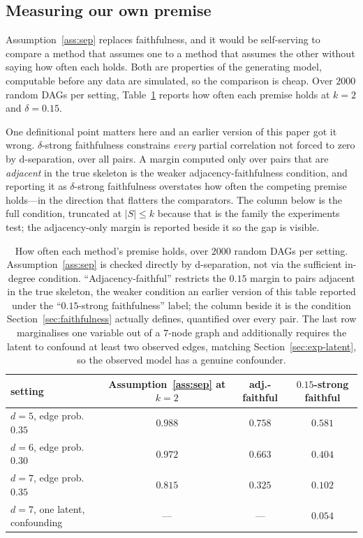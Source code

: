 \subsection{Measuring our own premise}\label{sec:exp-premise}

Assumption~\ref{ass:sep} replaces faithfulness, and it would be
self-serving to compare a method that assumes one to a method that assumes the
other without saying how often each holds. Both are properties of the
generating model, computable before any data are simulated, so the comparison
is cheap. Over $2000$ random DAGs per setting, Table~\ref{tab:premises} reports
how often each premise holds at $k = 2$ and $\delta = 0.15$.

One definitional point matters here and an earlier version of this paper got it
wrong. $\delta$-strong faithfulness constrains \emph{every} partial correlation
not forced to zero by d-separation, over all pairs. A margin computed only over
pairs that are \emph{adjacent} in the true skeleton is the weaker
adjacency-faithfulness condition, and reporting it as $\delta$-strong
faithfulness overstates how often the competing premise holds---in the
direction that flatters the comparators. The column below is the full
condition, truncated at $|S| \le k$ because that is the family the experiments
test; the adjacency-only margin is reported beside it so the gap is visible.

\begin{table}[t]
\centering
\caption{How often each method's premise holds, over $2000$ random DAGs per
setting. Assumption~\ref{ass:sep} is checked directly by d-separation, not via
the sufficient in-degree condition. ``Adjacency-faithful'' restricts the
$0.15$ margin to pairs adjacent in the true skeleton, the weaker condition an
earlier version of this table reported under the ``$0.15$-strong
faithfulness'' label; the column beside it is the condition
Section~\ref{sec:faithfulness} actually defines, quantified over every pair.
The last row marginalises one variable out of a $7$-node graph and additionally
requires the latent to confound at least two observed edges, matching
Section~\ref{sec:exp-latent}, so the observed model has a genuine
confounder.}\label{tab:premises}
\footnotesize
\begin{tabular}{@{}lccc@{}}
\toprule
setting & Assumption~\ref{ass:sep} at $k=2$ & adj.-faithful &
$0.15$-strong faithful \\
\midrule
$d=5$, edge prob.\ $0.35$      & $0.988$ & $0.758$ & $0.581$ \\
$d=6$, edge prob.\ $0.30$      & $0.972$ & $0.663$ & $0.404$ \\
$d=7$, edge prob.\ $0.35$      & $0.815$ & $0.325$ & $0.102$ \\
$d=7$, one latent, confounding & ---     & ---     & $0.054$ \\
\bottomrule
\end{tabular}
\end{table}

